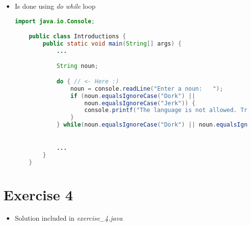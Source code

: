 \documentclass[12pt]{article}
\begin{document}
\begin{itemize}
    \item Is done using \textit{do while} loop

    \begin{lstlisting}[language=Java]
    import java.io.Console;

    public class Introductions {
        public static void main(String[] args) {
            ...

            String noun;

            do { // <- Here :)
                noun = console.readLine("Enter a noun:   ");
                if (noun.equalsIgnoreCase("Dork") ||
                    noun.equalsIgnoreCase("Jerk")) {
                    console.printf("The language is not allowed. Try again\n");
                }
            } while(noun.equalsIgnoreCase("Dork") || noun.equalsIgnoreCase("Jerk"))


            ...
        }
    }
    \end{lstlisting}
\end{itemize}

\bigskip

\section{Exercise 4}

\bigskip

\begin{itemize}
    \item Solution included in \textit{exercise\_4.java}
\end{itemize}
\end{document}
